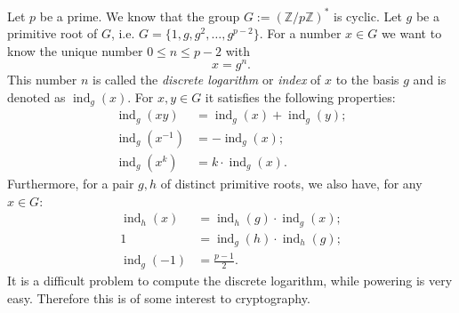 \documentclass[12pt]{article}
\begin{document}
Let $p$ be a prime. We know that the group $G:=(\mathbb{Z}/p\mathbb{Z})^*$ is cyclic. Let $g$ be a primitive root of $G$, i.e. $G=\{1,g,g^2,\dots,g^{p-2}\}$.
For a number $x\in G$ we want to know the unique number $0\leq n\leq p-2$ with
$$x=g^n.$$
This number $n$ is called the \textit{discrete logarithm} or \textit{index} of $x$ to the basis $g$ and is denoted as $\operatorname{ind}_g(x)$. For $x,y\in G$ it satisfies the following properties:
\begin{align*}
\operatorname{ind}_g(xy)&=\operatorname{ind}_g(x)+\operatorname{ind}_g(y);\\
\operatorname{ind}_g(x^{-1})&=-\operatorname{ind}_g(x);\\
\operatorname{ind}_g(x^k)&=k\cdot\operatorname{ind}_g(x).
\end{align*}
Furthermore, for a pair $g,h$ of distinct primitive roots, we also have, for any $x\in G$:
\begin{align*}
\operatorname{ind}_h(x)&=\operatorname{ind}_h(g)\cdot \operatorname{ind}_g(x);\\
1 &=\operatorname{ind}_g(h)\cdot \operatorname{ind}_h(g);\\
\operatorname{ind}_g(-1)&=\frac{p-1}{2}.
\end{align*}
It is a difficult problem to compute the discrete logarithm, while powering is very easy. Therefore this is of some interest to cryptography.
\end{document}
